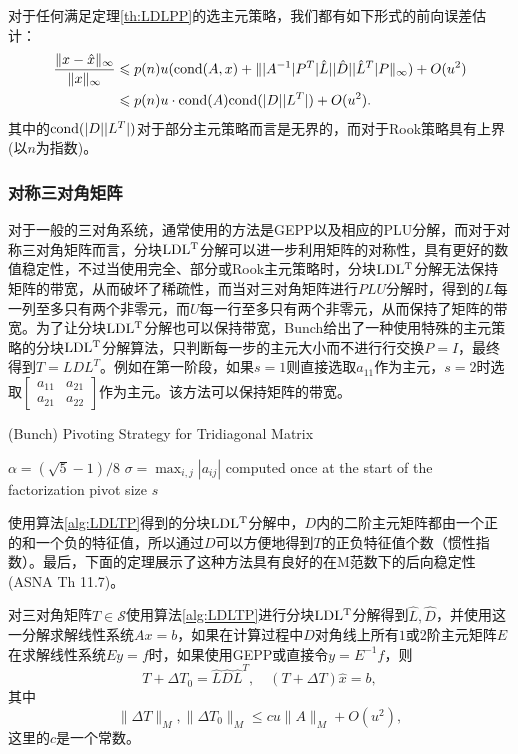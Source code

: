 \documentclass[a4paper,10pt]{ctexart}
\begin{document}
对于任何满足定理\ref{th:LDLPP}的选主元策略，我们都有如下形式的前向误差估计：
\begin{equation}
    \begin{aligned}
        \frac{\| x-\hat{x} \|_\infty}{\| x \|_\infty} 
        &\leqslant p(n)u({\rm cond}(A,x)+ \| |A^{-1}| P^T|\hat{L}| |\hat{D}| |\hat{L}^T|P \|_\infty)+O(u^2)\\
        &\leqslant p(n)u \cdot {\rm cond}(A) {\rm cond}(|D| |L^T|) +O(u^2).
    \end{aligned}
\end{equation}
其中的$ {\rm cond}(|D| |L^T|) $对于部分主元策略而言是无界的，而对于Rook策略具有上界(以$ n $为指数)。

\subsubsection*{对称三对角矩阵}
对于一般的三对角系统，通常使用的方法是GEPP以及相应的PLU分解，而对于对称三对角矩阵而言，分块$ {\rm LDL^T} $分解可以进一步利用矩阵的对称性，具有更好的数值稳定性，不过当使用完全、部分或Rook主元策略时，分块$ {\rm LDL^T} $分解无法保持矩阵的带宽，从而破坏了稀疏性，而当对三对角矩阵进行$ PLU $分解时，得到的$ L $每一列至多只有两个非零元，而$ U $每一行至多只有两个非零元，从而保持了矩阵的带宽。为了让分块$ {\rm LDL^T} $分解也可以保持带宽，Bunch给出了一种使用特殊的主元策略的分块$ {\rm LDL^T} $分解算法，只判断每一步的主元大小而不进行行交换$ P=I $，最终得到$ T = LDL^T $。例如在第一阶段，如果$ s=1 $则直接选取$ a_{11} $作为主元，$ s=2 $时选取$ \begin{bmatrix} 
    a_{11} & a_{21} \\ a_{21} & a_{22}
\end{bmatrix} $作为主元。该方法可以保持矩阵的带宽。
\begin{algorithm}[htbp]
    \caption{(Bunch) Pivoting Strategy for Tridiagonal Matrix}\label{alg:LDLTP}
    $ \alpha = (\sqrt{5}-1) / 8 $\;
    $ \sigma = \max_{i,j}|a_{ij}| $ computed once at the start of the factorization\;
    \Return pivot size $ s $\;
\end{algorithm}

使用算法\ref{alg:LDLTP}得到的分块$ {\rm LDL^T} $分解中，$ D $内的二阶主元矩阵都由一个正的和一个负的特征值，所以通过$ D $可以方便地得到$ T $的正负特征值个数（惯性指数）。最后，下面的定理展示了这种方法具有良好的在M范数下的后向稳定性(ASNA Th 11.7)。
\begin{theorem}
    对三对角矩阵$ T\in \mathcal{S} $使用算法\ref{alg:LDLTP}进行分块$ {\rm LDL^T} $分解得到$ \hat{L},\hat{D} $，并使用这一分解求解线性系统$ Ax=b $，如果在计算过程中$ D $对角线上所有$ 1 $或$ 2 $阶主元矩阵$ E $在求解线性系统$ Ey=f $时，如果使用GEPP或直接令$ y=E^{-1}f $，则
    \[
           T+\Delta T_0 = \hat{L} \hat{D} \hat{L}^T,\quad (T+\Delta T)\hat{x} = b,  
    \]
    其中
    \[
        \| \Delta T \|_M, \| \Delta T_0 \|_M \leqslant cu \| A \|_M + O(u^2),
    \]
    这里的$ c $是一个常数。
\end{theorem}
\end{document}
